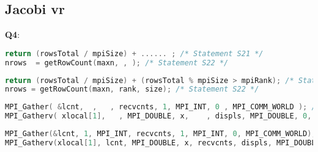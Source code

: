 \documentclass[a4paper, 10pt]{article}
\begin{document}
\subsection{Jacobi vr}

\textbf{Q4}: 
    \begin{lstlisting}[language=c, caption={Template S21, S22}]
return (rowsTotal / mpiSize) + ...... ; /* Statement S21 */
nrows  = getRowCount(maxn, , ); /* Statement S22 */
    \end{lstlisting}

    \begin{lstlisting}[language=c, caption={Correct S21, S22}]
return (rowsTotal / mpiSize) + (rowsTotal % mpiSize > mpiRank); /* Statement S21 */
nrows = getRowCount(maxn, rank, size); /* Statement S22 */
    \end{lstlisting}

    \begin{lstlisting}[language=c, caption={Template S23, S24}]
MPI_Gather( &lcnt,  ,   , recvcnts, 1, MPI_INT, 0 , MPI_COMM_WORLD ); /* Statement S23 */
MPI_Gatherv( xlocal[1],   , MPI_DOUBLE, x,    , displs, MPI_DOUBLE, 0, MPI_COMM_WORLD ); /* Statement S24 */
    \end{lstlisting}

    \begin{lstlisting}[language=c, caption={Correct S23, S24}]
MPI_Gather(&lcnt, 1, MPI_INT, recvcnts, 1, MPI_INT, 0, MPI_COMM_WORLD); /* Statement S23 */
MPI_Gatherv(xlocal[1], lcnt, MPI_DOUBLE, x, recvcnts, displs, MPI_DOUBLE, 0, MPI_COMM_WORLD); /* S24 */
    \end{lstlisting}
\end{document}
